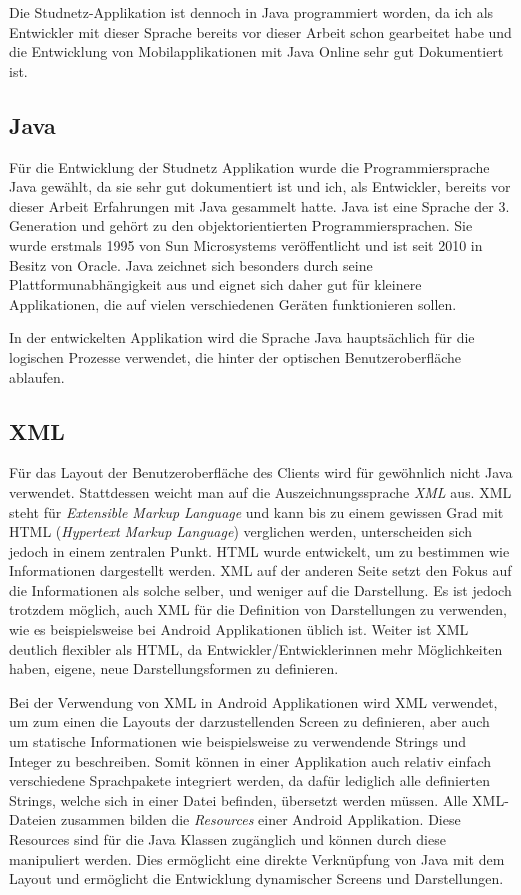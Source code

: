 \documentclass[../main.tex]{subfiles}
\begin{document}
	Die Studnetz-Applikation ist dennoch in Java programmiert worden, da ich als Entwickler mit dieser Sprache bereits vor dieser Arbeit schon gearbeitet habe und die Entwicklung von Mobilapplikationen mit Java Online sehr gut Dokumentiert ist. %
	
	\subsection{Java}
	Für die Entwicklung der Studnetz Applikation wurde die Programmiersprache Java gewählt, da sie sehr gut dokumentiert ist und ich, als Entwickler, bereits vor dieser Arbeit Erfahrungen mit Java gesammelt hatte. Java ist eine Sprache der 3. Generation und gehört zu den objektorientierten Programmiersprachen. Sie wurde erstmals 1995 von Sun Microsystems veröffentlicht und ist seit 2010 in Besitz von Oracle. Java zeichnet sich besonders durch seine Plattformunabhängigkeit aus und eignet sich daher gut für kleinere Applikationen, die auf vielen verschiedenen Geräten funktionieren sollen.
	
	In der entwickelten Applikation wird die Sprache Java hauptsächlich für die logischen Prozesse verwendet, die hinter der optischen Benutzeroberfläche ablaufen.
	
	\subsection{XML}
	Für das Layout der Benutzeroberfläche des Clients wird für gewöhnlich nicht Java verwendet. Stattdessen weicht man auf die Auszeichnungssprache \emph{XML} aus. XML steht für \emph{Extensible Markup Language} und kann bis zu einem gewissen Grad mit HTML (\emph{Hypertext Markup Language}) verglichen werden, unterscheiden sich jedoch in einem zentralen Punkt. HTML wurde entwickelt, um zu bestimmen wie Informationen dargestellt werden. XML auf der anderen Seite setzt den Fokus auf die Informationen als solche selber, und weniger auf die Darstellung. Es ist jedoch trotzdem möglich, auch XML für die Definition von Darstellungen zu verwenden, wie es beispielsweise bei Android Applikationen üblich ist. Weiter ist XML deutlich flexibler als HTML, da Entwickler/Entwicklerinnen mehr Möglichkeiten haben, eigene, neue Darstellungsformen zu definieren.
	
	Bei der Verwendung von XML in Android Applikationen wird XML verwendet, um zum einen die Layouts der darzustellenden Screen zu definieren, aber auch um statische Informationen wie beispielsweise zu verwendende Strings und Integer zu beschreiben. Somit können in einer Applikation auch relativ einfach verschiedene Sprachpakete integriert werden, da dafür lediglich alle definierten Strings, welche sich in einer Datei befinden, übersetzt werden müssen. Alle XML-Dateien zusammen bilden die \emph{Resources} einer Android Applikation. Diese Resources sind für die Java Klassen zugänglich und können durch diese manipuliert werden. Dies ermöglicht eine direkte Verknüpfung von Java mit dem Layout und ermöglicht die Entwicklung dynamischer Screens und Darstellungen. \cite{xml} \cite{xmlW3}
	
\end{document}
